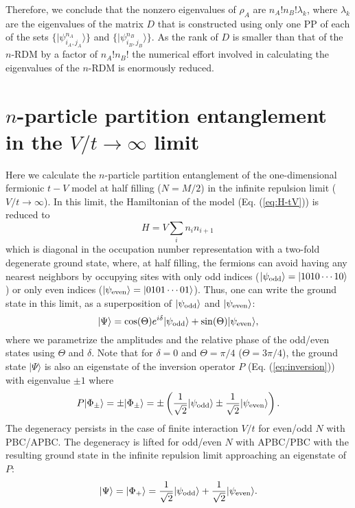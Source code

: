 Therefore, we conclude that the nonzero eigenvalues of $\rho_A$ are
$n_A!n_B!\lambda_k$, where $\lambda_k$ are the eigenvalues of the matrix $D$
that is constructed using only one PP of each of the sets $\{\vert
\psi^{n_A}_{i_A,j_A}\rangle\}$ and $\{\vert \psi^{n_B}_{i_B,j_B}\rangle\}$.
As the rank of $D$ is smaller than that of the $n$-RDM by a factor of
$n_A!n_B!$ the numerical effort involved in calculating the
eigenvalues of the $n$-RDM is enormously reduced.
\section{$n$-particle partition entanglement in the $V/t \to \infty$ limit} 
\label{appendixB}

Here we calculate the $n$-particle partition entanglement of the
one-dimensional fermionic $t-V$ model at half filling ($N=M/2$) in the infinite
repulsion limit ($V/t \rightarrow \infty$). In this limit, the Hamiltonian of
the model (Eq. (\ref{eq:H-tV})) is reduced to
%
\begin{equation}
  H= V\sum_i n_i n_{i+1}\,
  \label{eq:H-tV_infty}
\end{equation}
%
which is diagonal in the occupation number representation with a two-fold
degenerate ground state, where, at half filling, the fermions can avoid having
any nearest neighbors by occupying sites with only odd indices
($\vert\psi_{\rm{odd}}\rangle=\vert1010\cdots10\rangle$) or only even indices
($\vert\psi_{\rm{even}}\rangle=\vert0101\cdots01\rangle$). Thus, one can write the
ground state in this limit, as a superposition of
$\vert\psi_{\rm{odd}}\rangle$ and $\vert\psi_{\rm{even}}\rangle$:
%
\begin{equation}
\vert \Psi \rangle = \cos(\Theta)e^{i\delta}\vert\psi_{\rm{odd}}\rangle+\sin(\Theta)\vert\psi_{\rm{even}}\rangle,
  \label{eq:gs_infty_deg}
\end{equation}
%
where we parametrize the amplitudes and the relative phase of the odd/even 
states using $\Theta$ and $\delta$. Note that for $\delta=0$ and
$\Theta=\pi/4$ ($\Theta=3\pi/4$), the ground state $\vert\Psi\rangle$ is also
an eigenstate of the inversion operator $P$ (Eq. (\ref{eq:inversion})) with
eigenvalue $\pm 1$ where
%
\begin{equation}
P\vert\Phi_{\pm}\rangle=\pm\vert\Phi_{\pm}\rangle =\pm\left(\frac{1}{\sqrt{2}}\vert\psi_{\rm{odd}}\rangle\pm\frac{1}{\sqrt{2}}\vert\psi_{\rm{even}}\rangle\right).
\end{equation}
%
The degeneracy persists in the case of finite interaction $V/t$  for even/odd
$N$ with PBC/APBC. The degeneracy is lifted for odd/even $N$ with APBC/PBC
with the resulting ground state in the infinite repulsion limit approaching
an eigenstate of $P$:
%
\begin{equation}
\vert\Psi\rangle=\vert\Phi_+\rangle= \frac{1}{\sqrt{2}}\vert\psi_{\rm{odd}}\rangle+\frac{1}{\sqrt{2}}\vert\psi_{\rm{even}}\rangle.
  \label{eq:gs_infty_NONdeg}
\end{equation}


